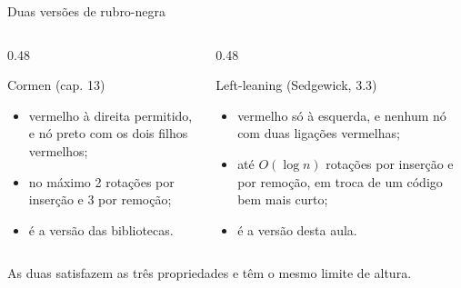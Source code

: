 \documentclass{beamer}
\begin{document}
\begin{frame}{Duas versões de rubro-negra}
	\begin{columns}[t]
		\begin{column}{0.48\textwidth}
			\begin{block}{Cormen (cap. 13)}
				\small
				\begin{itemize}
					\item vermelho à direita permitido, e nó preto com os dois filhos
					      vermelhos;
					\item no máximo 2 rotações por inserção e 3 por remoção;
					\item é a versão das bibliotecas.
				\end{itemize}
			\end{block}
		\end{column}
		\begin{column}{0.48\textwidth}
			\begin{block}{Left-leaning (Sedgewick, 3.3)}
				\small
				\begin{itemize}
					\item vermelho só à esquerda, e nenhum nó com duas ligações
					      vermelhas;
					\item até $O(\log n)$ rotações por inserção e por remoção, em troca
					      de um código bem mais curto;
					\item é a versão desta aula.
				\end{itemize}
			\end{block}
		\end{column}
	\end{columns}

	\vspace{0.4cm}
	As duas satisfazem as três propriedades e têm o mesmo limite de altura.
\end{frame}
\end{document}
